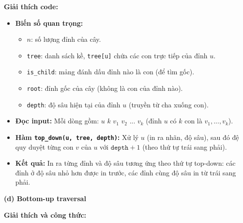 \documentclass{article}
\begin{document}
\textbf{Giải thích code:}

\begin{itemize}
    \item \textbf{Biến số quan trọng:}
    \begin{itemize}
        \item $n$: số lượng đỉnh của cây.
        \item \texttt{tree}: danh sách kề, \texttt{tree[u]} chứa các con trực tiếp của đỉnh $u$.
        \item \texttt{is\_child}: mảng đánh dấu đỉnh nào là con (để tìm gốc).
        \item \texttt{root}: đỉnh gốc của cây (không là con của đỉnh nào).
        \item \texttt{depth}: độ sâu hiện tại của đỉnh $u$ (truyền từ cha xuống con).
    \end{itemize}
    \item \textbf{Đọc input:} Mỗi dòng gồm: $u$ $k$ $v_1$ $v_2$ ... $v_k$ (đỉnh $u$ có $k$ con là $v_1, ..., v_k$).
    \item \textbf{Hàm \texttt{top\_down(u, tree, depth)}:} Xử lý $u$ (in ra nhãn, độ sâu), sau đó đệ quy duyệt từng con $v$ của $u$ với $\texttt{depth}+1$ (theo thứ tự trái sang phải).
    \item \textbf{Kết quả:} In ra từng đỉnh và độ sâu tương ứng theo thứ tự top-down: các đỉnh ở độ sâu nhỏ hơn được in trước, các đỉnh cùng độ sâu in từ trái sang phải.
\end{itemize}



\textbf{(d) Bottom-up traversal}

\textbf{Giải thích và công thức:}
\end{document}
